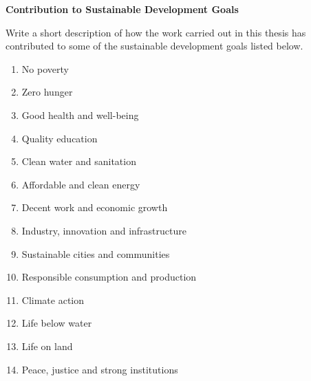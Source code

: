 \documentclass[a4paper, 11pt, oneside]{uet_thesis}  %
\begin{document}


\clearpage  %


\pagestyle{empty}  %

\clearpage 	%

\pagestyle{plain}  %

\vspace{0.5in}
\begin{center}
	\huge{\bf Contribution to Sustainable Development Goals} 
	\par
\end{center}

\vspace{0.5in}
Write a short description of how the work carried out in this thesis has contributed to some of the sustainable development goals listed below.

\begin{enumerate}[itemsep=0em]
	\item No poverty
	\item Zero hunger
	\item Good health and well-being
	\item Quality education
	\item Clean water and sanitation
	\item Affordable and clean energy
	\item Decent work and economic growth
	\item Industry, innovation and infrastructure
	\item Sustainable cities and communities
	\item Responsible consumption and production
	\item Climate action
	\item Life below water
	\item Life on land
	\item Peace, justice and strong institutions
\end{enumerate}
\end{document}
